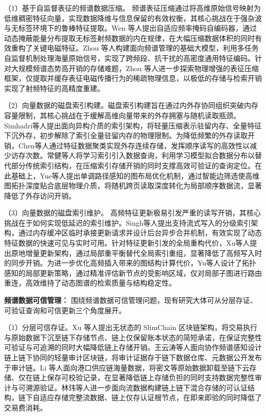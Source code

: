 （1）基于自监督表征的频谱数据压缩。 频谱表征压缩通过将高维原始信号映射为低维稠密特征向量，实现数据降维与信息保留的有效权衡，其核心挑战在于强杂波与无标签环境下的鲁棒特征提取。Wen 等人\cite{DBLP:journals/tmc/WenZWLZS26}提出自适应频率掩码自编码器，通过动态掩蔽能量分布提取无标签射频数据的内在规律，在大幅压缩数据体积的同时有效重构了关键电磁特征。Zhou 等人\cite{DBLP:journals/jsac/ZhouLZWWQC26}构建面向频谱管理的基础大模型，利用多任务自监督机制处理海量原始信号，实现了跨频段、抗干扰的高密度通用特征编码。针对大规模频谱态势高开销的存储难题，Zhou 等人\cite{DBLP:conf/icc/ZhouWWZC25}进一步探索物理增强的表征压缩框架，仅提取并缓存表征电磁传播行为的稀疏物理信息，以极低的存储与检索开销实现了射频特征的高精度重建。

（2）向量数据的磁盘索引构建。磁盘索引构建旨在通过内外存协同组织突破内存容量限制，其核心挑战在于缓解高维向量带来的外存拥塞与随机读取瓶颈。Simhadri等人\cite{DBLP:conf/nips/SubramanyaDSKK19}提出面向异构介质的索引架构，将轻量压缩表示驻留内存、全量特征下沉外存，初步解除了索引全量驻留内存的物理限制。为降低频繁的外存读取开销，Chen等人\cite{DBLP:conf/nips/ChenZWLLLYW21}通过特征数据聚类实现外存连续存储，发挥顺序读写的高效性以减少访存次数。常健等人\cite{DBLP:journals/pacmmod/WangXYWPKGXGX24}将学习索引引入数据查询，利用学习模型拟合数据分布以替代部分传统索引结构，在压缩索引存储开销的同时支撑高效可验证的查询定位。在此基础上，Yue等人\cite{DBLP:journals/pvldb/YueZXXZDGZJ25}提出单调路径感知的图布局优化机制，通过智能边筛选使高维图拓扑深度贴合底层物理介质，将随机跨页读取深度转化为局部顺序数据流，显著降低了外存访问开销。

（3）向量数据的磁盘索引维护。%
高频特征更新极易引发严重的读写开销，其核心挑战在于如何实现低延迟的索引维护。Singh等人\cite{DBLP:journals/corr/abs-2105-09613}提出支持流式写入的分级索引架构，通过内存缓冲区临时承接更新请求并设计后台异步合并机制，有效实现了动态特征数据的快速可见与实时可用。针对特征更新引发的全局重构代价，Xu等人\cite{DBLP:conf/sosp/XuLLXCZLYYYCY23}提出原地增量更新架构，通过局部重平衡替代全局索引重组，显著降低了高频写入时的同步开销。为进一步优化高频插入带来的图结构计算代价，Yu等人\cite{DBLP:journals/pvldb/YuLGXLZSZLY25}设计了拓扑感知的局部更新策略，通过精准评估新节点的受影响区域，仅对局部子图进行路由重连，高效维持了动态图谱的检索质量与结构稳定性。

\textbf{频谱数据可信管理：}
围绕频谱数据可信管理问题，现有研究大体可从分层存证、可验证查询和可信更新三个角度展开。

（1）分层可信存证。Xu 等人\cite{Xu2021SlimChain}提出无状态的 SlimChain 区块链架构，将交易执行与原始数据下沉至链下存储节点、链上仅保留账本状态的简短承诺，在保证完整性可验证与可追溯的同时大幅降低链上存储开销。王云涛等人\cite{WangYT23}面向协作频谱感知设计链上链下协同的轻量审计区块链，将审计证据存于链下数据仓库、元数据公开发布于审计链。Li 等人\cite{LiHWWLC25}面向港口供应链海量数据，将密文等原始数据卸载至链下云存储、仅在链上保存可校验记录，在显著降低链上存储负担的同时支持数据完整性审计与可溯源验证。林玮等人\cite{LinW26}进一步面向流数据构建链上链下混合存储的可认证结构，链下自适应存储完整流数据、链上仅存认证根节点，在即来即验的同时降低了交易费消耗。

